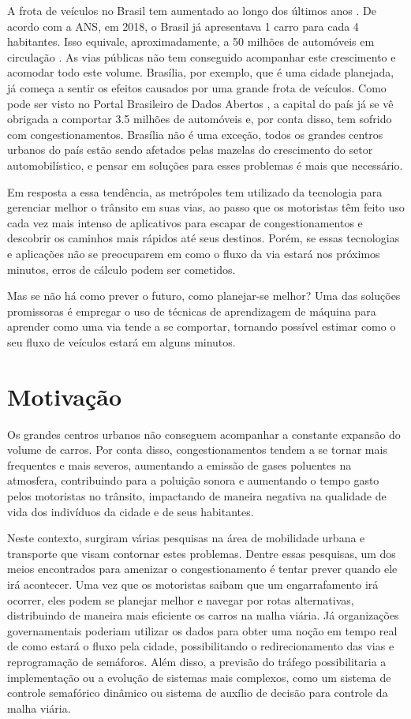A frota  de  veículos no Brasil tem aumentado ao longo  dos últimos anos \cite{mapa_moto2019v2}. De acordo com a \acrfull{ANS}, em 2018, o Brasil já apresentava 1 carro para cada 4 habitantes. Isso equivale, aproximadamente, a 50 milhões de automóveis em circulação \cite{G1}. As vias públicas não tem conseguido acompanhar este crescimento e acomodar todo este volume. Brasília, por exemplo, que é uma cidade planejada, já começa a sentir os efeitos causados por uma grande frota de veículos. Como pode ser visto no Portal Brasileiro de Dados Abertos \cite{detran_2018}, a capital do país já se vê obrigada a comportar 3.5 milhões de automóveis e, por conta disso, tem sofrido com congestionamentos. Brasília não é uma exceção, todos os grandes centros urbanos do país estão sendo afetados pelas mazelas do crescimento do setor automobilístico, e pensar em soluções para esses problemas é mais que necessário.

Em resposta a essa tendência, as metrópoles tem utilizado da tecnologia para gerenciar melhor o trânsito em suas vias, ao passo que os motoristas têm feito uso cada vez mais intenso de aplicativos para escapar de congestionamentos e descobrir os caminhos mais rápidos até seus destinos. Porém, se essas tecnologias e aplicações não se preocuparem em como o fluxo da via estará nos próximos minutos, erros de cálculo podem ser cometidos.

Mas se não há como prever o futuro, como planejar-se melhor? Uma das soluções promissoras é empregar o uso de técnicas de aprendizagem de máquina para aprender como uma via tende a se comportar, tornando possível estimar como o seu fluxo de veículos estará em alguns minutos.

\section{Motivação}

Os grandes centros urbanos não conseguem acompanhar a constante expansão do volume de carros. Por conta disso, congestionamentos tendem a se tornar mais frequentes e mais severos, aumentando a emissão de gases poluentes na atmosfera, contribuindo para a poluição sonora e aumentando o tempo gasto pelos motoristas no trânsito, impactando de maneira negativa na qualidade de vida dos indivíduos da cidade e de seus habitantes.

Neste contexto, surgiram várias pesquisas na área de mobilidade urbana e transporte que visam contornar estes problemas. Dentre essas pesquisas, um dos meios encontrados para amenizar o congestionamento é tentar prever quando ele irá acontecer. Uma vez que os motoristas saibam que um engarrafamento irá ocorrer, eles podem se planejar melhor e navegar por rotas alternativas, distribuindo de maneira mais eficiente os carros na malha viária. Já organizações governamentais poderiam utilizar os dados para obter uma noção em tempo real de como estará o fluxo pela cidade, possibilitando o redirecionamento das vias e reprogramação de semáforos. Além disso, a previsão do tráfego possibilitaria a implementação ou a evolução de sistemas mais complexos, como um sistema de controle semafórico dinâmico ou sistema de auxílio de decisão para controle da malha viária.

